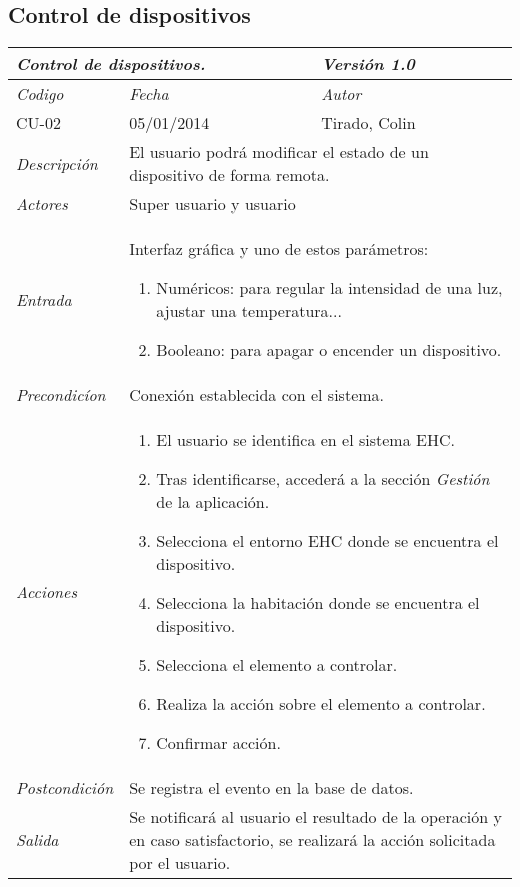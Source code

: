 \subsection{Control de dispositivos}
\begin{center}
    \begin{tabular}{|p{3cm}|p{4cm}|p{4cm}|p{4cm}|}
    \hline \multicolumn{3}{|p{9cm}|}{\textit{Control de dispositivos.}} & \textit{Versi\'on 1.0} \\
	\hline \textit{Codigo} & \textit{Fecha} & \multicolumn{2}{|p{6cm}|}{\textit{Autor}} \\
	CU-02 & 05/01/2014 & \multicolumn{2}{|p{6cm}|}{Tirado, Colin} \\		
    \hline \textit{Descripci\'on} & \multicolumn{3}{|p{9cm}|}{El usuario podr\'a modificar el estado de un dispositivo de forma remota.} \\
    \hline \textit{Actores} & \multicolumn{3}{|p{9cm}|}{Super usuario y usuario} \\
    \hline \textit{Entrada} & \multicolumn{3}{|p{9cm}|}{Interfaz gr\'afica y uno de estos par\'ametros:
    \begin{enumerate}
    \item Num\'ericos: para regular la intensidad de una luz, ajustar una temperatura...
    \item Booleano: para apagar o encender un dispositivo.
    \end{enumerate}} \\
    \hline \textit{Precondic\'ion} & \multicolumn{3}{|p{9cm}|}{Conexi\'on establecida con el sistema.} \\
    \hline \textit{Acciones} & \multicolumn{3}{|p{9cm}|}{
    \begin{enumerate}
    \item El usuario se identifica en el sistema EHC.
    \item Tras identificarse, acceder\'a a la secci\'on \textit{Gesti\'on} de la aplicaci\'on.
    \item Selecciona el entorno EHC donde se encuentra el dispositivo.
    \item Selecciona la habitaci\'on donde se encuentra el dispositivo.
    \item Selecciona el elemento a controlar.
    \item Realiza la acci\'on sobre el elemento a controlar.
    \item Confirmar acci\'on.
    \end{enumerate}
       } \\
    \hline \textit{Postcondici\'on} & \multicolumn{3}{|p{9cm}|}{Se registra el evento en la base de datos.} \\
    \hline \textit{Salida} & \multicolumn{3}{|p{9cm}|}{Se notificar\'a al usuario el resultado de la operaci\'on y en caso satisfactorio, se realizar\'a la acci\'on solicitada por el usuario.} \\ \hline
    \end{tabular}
\end{center}